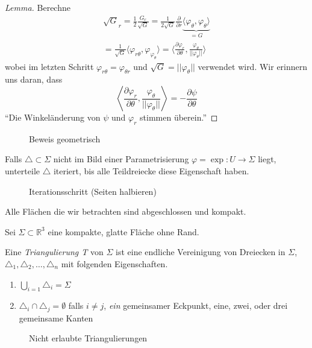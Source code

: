 \documentclass[../main.tex]{subfiles}
\begin{document}
\begin{proof}[Lemma]
    Berechne 
    \begin{align*}
        \sqrt{G}_r = \frac{1}{2} \frac{G_r}{\sqrt{G}} = \frac{1}{2\sqrt{G}} \frac{\partial}{\partial r} \underbrace{\langle \varphi_{\theta} , \varphi_{\theta} \rangle}_{=G} \\
        = \frac{1}{\sqrt{G}} \langle \varphi_{r\theta}, \varphi_{\varphi_\theta} \rangle = \langle \frac{\partial \varphi _r}{\partial \theta} , \frac{\varphi_{\theta}}{||\varphi _{\theta}||} \rangle
    \end{align*} wobei im letzten Schritt $\varphi_{r\theta} = \varphi_{\theta r}$ und $\sqrt{G} = ||\varphi_{\theta}||$ verwendet wird.
    Wir erinnern uns daran, dass
    $$\left \langle \frac{\partial \varphi_r}{\partial \theta}, \frac{\varphi _{\theta}}{||\varphi_{\theta}||} \right \rangle = -\frac{\partial \psi}{\partial \theta}$$
    ``Die Winkeländerung von $\psi$ und $\varphi_r$ stimmen überein.''
\end{proof}

\begin{figure}[htb]
    \centering
    \def\svgwidth{30em}
    
    \caption{Beweis geometrisch}        
\end{figure}

\begin{remark}
    Falls $\triangle \subset \Sigma$ nicht im Bild einer Parametrisierung
    $\varphi = \exp : U \to \Sigma $ liegt, unterteile $\triangle$ iteriert, bis alle Teildreiecke diese Eigenschaft haben.
\end{remark}

\begin{figure}[htb]
    \centering
    \def\svgwidth{10em}
    
    \caption{Iterationsschritt (Seiten halbieren)}        
\end{figure}

Alle Flächen die wir betrachten sind abgeschlossen und kompakt.

Sei $\Sigma \subset \mathbb{R}^3$ eine kompakte, glatte Fläche ohne Rand.
\begin{definition}
    Eine \emph{Triangulierung T} von $\Sigma$ ist eine endliche Vereinigung von Dreiecken in $\Sigma$,
    $\triangle_1, \triangle_2, \dots, \triangle_n$ mit folgenden Eigenschaften.
    \begin{enumerate}
        \item $\bigcup_{i=1} \triangle_i = \Sigma$
        \item $\triangle_i \cap \triangle_j = \emptyset$ falls $i \not = j$, \emph{ein} gemeinsamer Eckpunkt, eine, zwei, oder drei gemeinsame Kanten
    \end{enumerate}

    \begin{figure}[htb]
        \centering
        \def\svgwidth{10em}
        
        \caption{Nicht erlaubte Triangulierungen}        
    \end{figure}

\end{definition}
\end{document}
